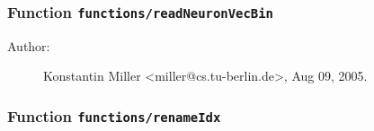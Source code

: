 \subsubsection[Function \texttt{readNeuronVecBin}]{Function \texttt{functions/readNeuronVecBin}}%
%
\label{ref_functions__readNeuronVecBin}%
\hypertarget{ref_functions__readNeuronVecBin}{}%
\begin{description}
%
%
%
%
%
%
%
\item[Author:]%
Konstantin Miller <miller@cs.tu-berlin.de>, Aug 09, 2005.
%
\end{description}
\methodline%
\subsubsection[Function \texttt{renameIdx}]{Function \texttt{functions/renameIdx}}%
%
\label{ref_functions__renameIdx}%
\hypertarget{ref_functions__renameIdx}{}%
